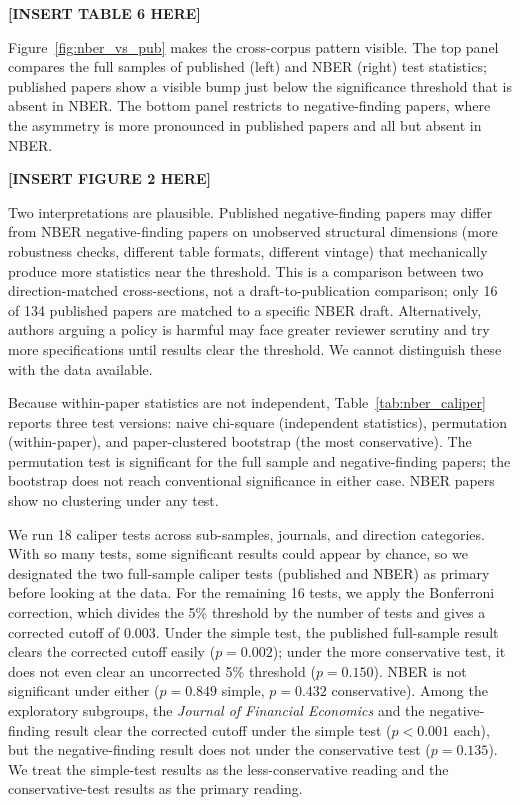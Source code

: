 \documentclass[12pt]{article}
\newcommand{\JFE}{\textit{Journal of Financial Economics}}
\begin{document}
\begin{center}
\textbf{[INSERT TABLE 6 HERE]}
\end{center}

Figure~\ref{fig:nber_vs_pub} makes the cross-corpus pattern visible.
The top panel compares the full samples of published (left) and NBER
(right) test statistics; published papers show a visible bump just
below the significance threshold that is absent in NBER.  The bottom
panel restricts to negative-finding papers, where the asymmetry is
more pronounced in published papers and all but absent in NBER.


\begin{center}
\textbf{[INSERT FIGURE 2 HERE]}
\end{center}

Two interpretations are plausible.  Published negative-finding papers
may differ from NBER negative-finding papers on unobserved structural
dimensions (more robustness checks, different table formats, different
vintage) that mechanically produce more statistics near the threshold.
This is a comparison between two direction-matched cross-sections, not
a draft-to-publication comparison; only 16 of 134 published papers are
matched to a specific NBER draft.  Alternatively, authors arguing a
policy is harmful may face greater reviewer scrutiny and try more
specifications until results clear the threshold.  We cannot
distinguish these with the data available.

Because within-paper statistics are not independent,
Table~\ref{tab:nber_caliper} reports three test versions: naive
chi-square (independent statistics), permutation (within-paper), and
paper-clustered bootstrap (the most conservative).  The permutation
test is significant for the full sample and negative-finding papers;
the bootstrap does not reach conventional significance in either
case.  NBER papers show no clustering under any test.



We run 18 caliper tests across sub-samples, journals, and direction
categories.  With so many tests, some significant results could
appear by chance, so we designated the two full-sample caliper tests
(published and NBER) as primary before looking at the data.  For the
remaining 16 tests, we apply the Bonferroni correction, which
divides the 5\% threshold by the number of tests and gives a
corrected cutoff of $0.003$.  Under the simple test, the published
full-sample result clears the corrected cutoff easily
($p = 0.002$); under the more conservative test, it does not even
clear an uncorrected 5\% threshold ($p = 0.150$).  NBER is not
significant under either ($p = 0.849$ simple, $p = 0.432$
conservative).  Among the exploratory subgroups, the \JFE{} and the
negative-finding result clear the corrected cutoff under the simple
test ($p < 0.001$ each), but the negative-finding result does not
under the conservative test ($p = 0.135$).  We treat the simple-test
results as the less-conservative reading and the conservative-test
results as the primary reading.
\end{document}
